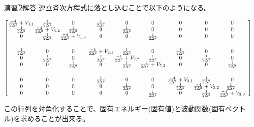 \documentclass{beamer}
\begin{document}
\begin{frame}{演習\,\textcircled{2}\quad 解答}
    連立斉次方程式に落とし込むことで以下のようになる。
    
    {\tiny
    \[
    \left[
    \begin{array}{@{\hskip 1pt}c@{\hskip 1pt}c@{\hskip 1pt}c@{\hskip 3pt}
                  @{\hskip 1pt}c@{\hskip 1pt}c@{\hskip 1pt}c@{\hskip 3pt}
                  @{\hskip 1pt}c@{\hskip 1pt}c@{\hskip 1pt}c}
    \frac{-4}{2\Delta^2}+V_{1,1} &  \frac{1}{2\Delta^2} & 0 &  \frac{1}{2\Delta^2} & 0 & 0 & 0 & 0 & 0 \\
    \frac{1}{2\Delta^2} & \frac{-4}{2\Delta^2}+V_{1,2} &  \frac{1}{2\Delta^2} & 0 &  \frac{1}{2\Delta^2} & 0 & 0 & 0 & 0 \\
    0 &  \frac{1}{2\Delta^2} & \frac{-4}{2\Delta^2}+V_{1,3} & 0 & 0 &  \frac{1}{2\Delta^2} & 0 & 0 & 0 \\
    \rule{0pt}{1.2em} \\  %
    \frac{1}{2\Delta^2} & 0 & 0 & \frac{-4}{2\Delta^2}+V_{2,1} &  \frac{1}{2\Delta^2} & 0 &  \frac{1}{2\Delta^2} & 0 & 0 \\
    0 &  \frac{1}{2\Delta^2} & 0 &  \frac{1}{2\Delta^2} & \frac{-4}{2\Delta^2}+V_{2,2} &  \frac{1}{2\Delta^2} & 0 &  \frac{1}{2\Delta^2} & 0 \\
    0 & 0 &  \frac{1}{2\Delta^2} & 0 &  \frac{1}{2\Delta^2} & \frac{-4}{2\Delta^2}+V_{2,3} & 0 & 0 &  \frac{1}{2\Delta^2} \\
    \rule{0pt}{1.2em} \\
    0 & 0 & 0 &  \frac{1}{2\Delta^2} & 0 & 0 & \frac{-4}{2\Delta^2}+V_{3,1} &  \frac{1}{2\Delta^2} & 0 \\
    0 & 0 & 0 & 0 &  \frac{1}{2\Delta^2} & 0 &  \frac{1}{2\Delta^2} & \frac{-4}{2\Delta^2}+V_{3,2} &  \frac{1}{2\Delta^2}1 \\
    0 & 0 & 0 & 0 & 0 &  \frac{1}{2\Delta^2} & 0 &  \frac{1}{2\Delta^2} & \frac{-4}{2\Delta^2}+V_{3,3}
    \end{array}
    \right]
    \]
    \normalsize}

    この行列を対角化することで、固有エネルギー(固有値)と波動関数(固有ベクトル)を求めることが出来る。
    

\end{frame}
    
\end{document}

